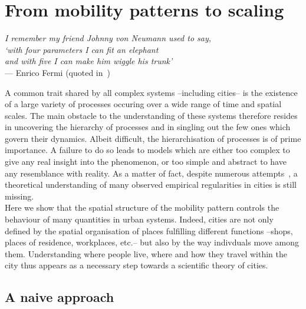 %
\chapter{From mobility patterns to scaling}
\label{chap:scaling_model}

\begin{flushright}{\slshape    
I remember my friend Johnny von Neumann used to say,\\
`with four parameters I can fit an elephant\\
and with five I can make him wiggle his trunk'} \\ \medskip
--- Enrico Fermi (quoted in~\cite{Dyson:2004})
\end{flushright}

\bigskip

A common trait shared by all complex systems --including cities-- is the
existence of a large variety of processes occuring over a wide range of time and
spatial scales. The main obstacle to the understanding of these systems
therefore resides in uncovering the hierarchy of processes and in singling out
the few ones which govern their dynamics. Albeit difficult, the hierarchisation
of processes is of prime importance. A failure to do so leads to models which
are  either too complex to give any real insight into the phenomenon, or too
simple and abstract to have any resemblance with reality. As a matter of fact,
despite numerous
attempts~\cite{Fujita:1982,Makse:1995,Batty:2008,Frasco:2014,Bettencourt:2010,Bettencourt:2013},
a theoretical understanding of many observed empirical regularities in cities is
still missing.\\

Here we show that the spatial structure of the mobility pattern
controls the behaviour of many quantities in urban systems. Indeed, cities are
not only defined by the spatial organisation of places fulfilling different
functions --shops, places of residence, workplaces, etc.-- but also by the way
indivduals move among them. Understanding where people live, where and how they
travel within the city thus appears as a necessary step towards a scientific
theory of cities.\\ 

\section{A naive approach}
\label{sec:elementary_understanding_of_the_scaling_relationships}

